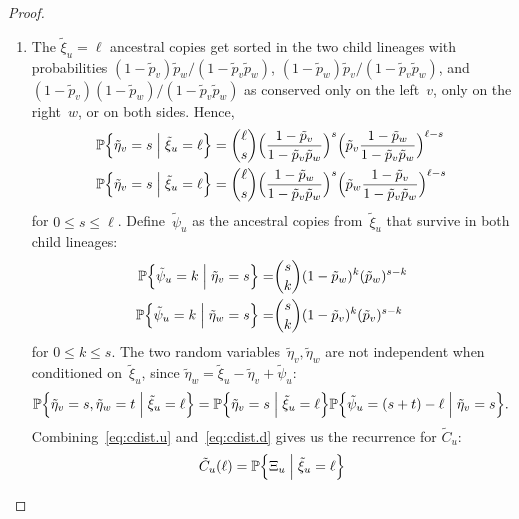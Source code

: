 \documentclass{elsarticle}
\newcommand{\condgen}[6]{{#1}#2 #5 #3 #6 #4}
\newcommand{\PROB}{\mathbb{P}}
\newcommand{\Probcmd}[2]{\condgen{\PROB}{\Bigl\{}{\Bigm|}{\Bigr\}}{#1}{#2}}
\newcommand{\nlik}{C}
\newcommand{\nx}{u}
\newcommand{\ny}{v}
\newcommand{\nz}{w}
\begin{document}
\begin{proof}
\begin{enumerate}[label=(\roman*)]
\item
The $\tilde{\xi}_{\nx}=\ell$ ancestral copies 
get sorted in the two child lineages with probabilities 
$(1-\tilde{p}_{\ny})\tilde{p}_{\nz}/(1-\tilde{p}_{\ny}\tilde{p}_{\nz})$, 
$(1-\tilde{p}_{\nz})\tilde{p}_{\ny}/(1-\tilde{p}_{\ny}\tilde{p}_{\nz})$, and 
$(1-\tilde{p}_{\ny})(1-\tilde{p}_{\nz})/(1-\tilde{p}_{\ny}\tilde{p}_{\nz})$ 
as conserved only on the left~$\ny$, only on the right~$\nz$, 
or on both sides.  
Hence, 
\begin{align}
\Probcmd{\tilde{\eta}_{\ny}=s}{\tilde{\xi}_{\nx}=\ell}
	& = \binom{\ell}{s} \Bigl(\frac{1-\tilde{p}_{\ny}}{1-\tilde{p}_{\ny}\tilde{p}_{\nz}}\Bigr)^s \Bigl(\tilde{p}_{\ny} \frac{1-\tilde{p}_{\nz}}{1-\tilde{p}_{\ny}\tilde{p}_{\nz}}\Bigr)^{\ell-s}
	\label{eq:cdist.u}
	\\
\Probcmd{\tilde{\eta}_{\ny}=s}{\tilde{\xi}_{\nx}=\ell}
	& = \binom{\ell}{s} \Bigl(\frac{1-\tilde{p}_{\nz}}{1-\tilde{p}_{\ny}\tilde{p}_{\nz}}\Bigr)^s \Bigl(\tilde{p}_{\nz}\frac{1-\tilde{p}_{\ny}}{1-\tilde{p}_{\ny}\tilde{p}_{\nz}}\Bigr)^{\ell-s}
	\notag
\end{align}
for $0\le s\le \ell$. 
Define~$\tilde{\psi}_{\nx}$ as the ancestral copies from~$\tilde{\xi}_{\nx}$
that survive in both child lineages:
\begin{align}
\Probcmd{\tilde{\psi}_{\nx}=k}{\tilde{\eta}_{\ny}=s}
	= & \binom{s}{k} (1-\tilde{p}_{\nz})^k (\tilde{p}_{\nz})^{s-k}
	\label{eq:cdist.d} 
	\\
\Probcmd{\tilde{\psi}_{\nx}=k}{\tilde{\eta}_{\nz}=s}
	= & \binom{s}{k} (1-\tilde{p}_{\ny})^k (\tilde{p}_{\ny})^{s-k}
	\notag
\end{align}
for $0\le k\le s$.  The two random 
variables~$\tilde{\eta}_{\ny},\tilde{\eta}_{\nz}$ 
are not independent 
when conditioned on~$\tilde{\xi}_{\nx}$, since 
$\tilde{\eta}_{\nz} = \tilde{\xi}_{\nx}-\tilde{\eta}_{\ny}+\tilde{\psi}_{\nx}$:  
\begin{align*}
\Probcmd{\tilde{\eta}_{\ny}=s,\tilde{\eta}_{\nz}=t}{\tilde{\xi}_{\nx}=\ell}
	& = \Probcmd{\tilde{\eta}_{\ny}=s}{\tilde{\xi}_{\nx}=\ell}
		\Probcmd{\tilde{\psi}_{\nx}=(s+t)-\ell}{\tilde{\eta}_{\ny}=s}.
\end{align*}
Combining~\eqref{eq:cdist.u} and~\eqref{eq:cdist.d}
gives us the recurrence for $\tilde{\nlik}_{\nx}$: 
\begin{align*}
\tilde{\nlik}_{\nx}(\ell)
 & = \Probcmd{\Xi_{\nx}}{\tilde{\xi}_{\nx}=\ell}
 \\

\end{align*}
\end{enumerate}
\end{proof}
\end{document}
